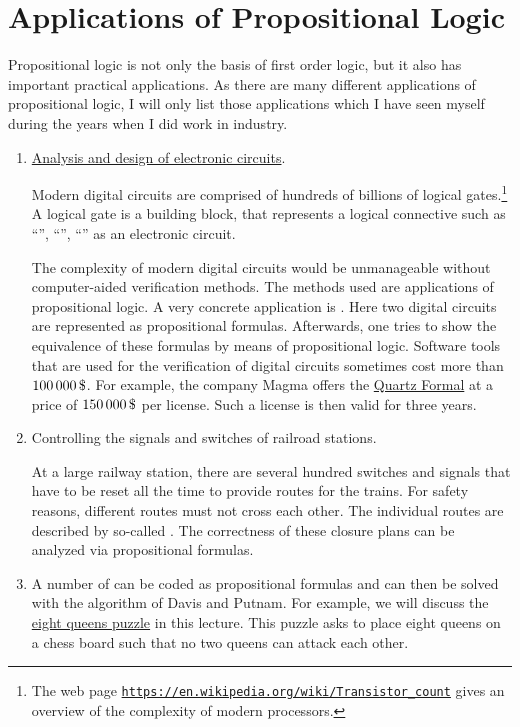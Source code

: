 \section{Applications of Propositional Logic}
Propositional logic is not only the basis of first order logic, but it also has important practical
applications.  As there are many different applications of propositional logic, I will only list those
applications which I have seen myself during the years when I did work in industry.
\begin{enumerate}
\item \href{https://en.wikipedia.org/wiki/Electronic_design_automation}{Analysis and design of electronic circuits}.

      Modern digital circuits are comprised of hundreds of billions of logical gates.\footnote{The web page
      \href{https://en.wikipedia.org/wiki/Transistor_count}{\texttt{https://en.wikipedia.org/wiki/Transistor\_count}}
      gives an overview of the complexity of modern processors.}
      A logical gate  is a building block, that represents a logical connective such as ``'',
      ``'', ``'' as an electronic circuit.

      The complexity of modern digital circuits would be unmanageable without
      computer-aided verification methods.  The methods used are applications of propositional logic. 
      A very concrete application is .  Here two
      digital circuits are represented as propositional formulas.
      Afterwards, one tries to show the equivalence of these formulas by means of propositional logic.
      Software tools that are used for the verification of digital
      circuits sometimes cost more than $100\,000\,\symbol{36}$.
      For example, the company Magma offers the 
      \href{https://www.eetimes.com/document.asp?doc_id=1217672}{Quartz Formal} at a price
      of $150\,000\,
      \symbol{36}$ per license.  Such a license is then valid for three years.


\item Controlling the signals and switches of railroad stations.

      At a large railway station, there are several hundred switches and signals that have to be 
      reset all the time to provide routes for the trains.
      For safety reasons, different routes must not cross each other.  
      The individual routes are described by so-called .
      The correctness of these closure plans can be analyzed via propositional formulas.
\item A number of  can be coded as propositional formulas and can then be solved with the
      algorithm of Davis and Putnam.
      For example, we will discuss the 
      \href{https://en.wikipedia.org/wiki/Eight_queens_puzzle}{eight queens puzzle} in this lecture.
      This puzzle asks to place eight queens on a chess board such that no two queens can attack each other.
\end{enumerate}

